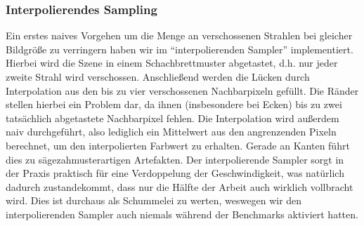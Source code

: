 \subsubsection{Interpolierendes Sampling}
Ein erstes naives Vorgehen um die Menge an verschossenen Strahlen bei gleicher Bildgröße zu verringern haben wir im "`interpolierenden Sampler"' implementiert.
Hierbei wird die Szene in einem Schachbrettmuster abgetastet, d.h. nur jeder zweite Strahl wird verschossen.
Anschließend werden die Lücken durch Interpolation aus den bis zu vier verschossenen Nachbarpixeln gefüllt.
Die Ränder stellen hierbei ein Problem dar, da ihnen (insbesondere bei Ecken) bis zu zwei tatsächlich abgetastete Nachbarpixel fehlen.
Die Interpolation wird außerdem naiv durchgeführt, also lediglich ein Mittelwert aus den angrenzenden Pixeln berechnet, um den interpolierten Farbwert zu erhalten.
Gerade an Kanten führt dies zu sägezahmusterartigen Artefakten.
Der interpolierende Sampler sorgt in der Praxis praktisch für eine Verdoppelung der Geschwindigkeit, was natürlich dadurch zustandekommt, dass nur die Hälfte der Arbeit auch wirklich vollbracht wird.
Dies ist durchaus als Schummelei zu werten, weswegen wir den interpolierenden Sampler auch niemals während der Benchmarks aktiviert hatten.

